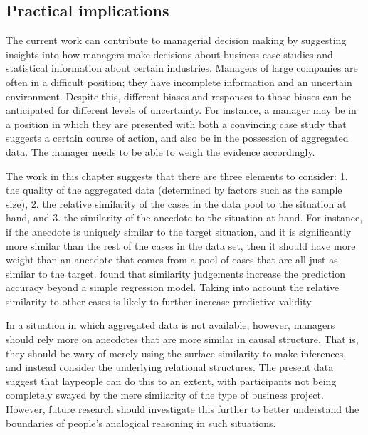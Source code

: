 \documentclass[a4paper, nobind, dvipsnames]{templates/ociamthesis}
\theoremstyle{definition}
\theoremstyle{definition}
\theoremstyle{definition}
\theoremstyle{definition}
\theoremstyle{remark}
\begin{document}
\subsection{Practical implications}

The current work can contribute to managerial decision making by suggesting
insights into how managers make decisions about business case studies and
statistical information about certain industries. Managers of large companies
are often in a difficult position; they have incomplete information and an
uncertain environment. Despite this, different biases and responses to those
biases can be anticipated for different levels of uncertainty. For instance, a
manager may be in a position in which they are presented with both a convincing
case study that suggests a certain course of action, and also be in the
possession of aggregated data. The manager needs to be able to weigh the
evidence accordingly.

The work in this chapter suggests that there are three elements to consider: 1.
the quality of the aggregated data (determined by factors such as the sample
size), 2. the relative similarity of the cases in the data pool to the situation
at hand, and 3. the similarity of the anecdote to the situation at hand. For
instance, if the anecdote is uniquely similar to the target situation, and it is
significantly more similar than the rest of the cases in the data set, then it
should have more weight than an anecdote that comes from a pool of cases that
are all just as similar to the target. \textcite{lovallo2012} found that similarity
judgements increase the prediction accuracy beyond a simple regression model.
Taking into account the relative similarity to other cases is likely to further
increase predictive validity.

In a situation in which aggregated data is not available, however, managers
should rely more on anecdotes that are more similar in causal structure. That
is, they should be wary of merely using the surface similarity to make
inferences, and instead consider the underlying relational structures. The
present data suggest that laypeople can do this to an extent, with participants
not being completely swayed by the mere similarity of the type of business
project. However, future research should investigate this further to better
understand the boundaries of people's analogical reasoning in such situations.

\newpage

\printbibliography[segment=\therefsegment,heading=subbibintoc]
\end{document}
